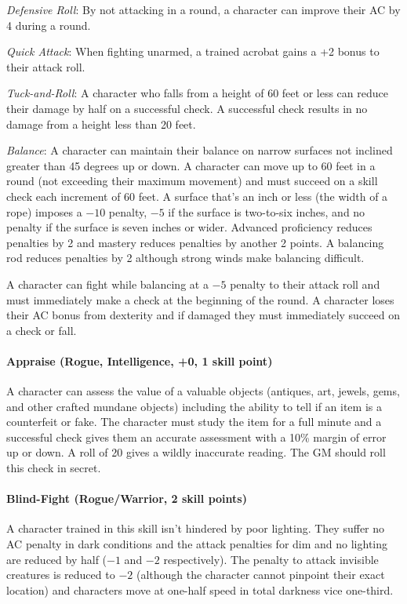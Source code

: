 \begin{multicols}{2}
\textit{Defensive Roll}: By not attacking in a round, a character can improve their AC by 4 during a round.  

\textit{Quick Attack}: When fighting unarmed, a trained acrobat gains a +2 bonus to their attack roll.

\textit{Tuck-and-Roll}: A character who falls from a height of 60 feet or less can reduce their damage by half on a successful check.  A successful check results in no damage from a height less than 20 feet.

\textit{Balance}: A character can maintain their balance on narrow surfaces not inclined greater than 45 degrees up or down.  A character can move up to 60 feet in a round (not exceeding their maximum movement) and must succeed on a skill check each increment of 60 feet.  A surface that's an inch or less (the width of a rope) imposes a $-10$ penalty, $-5$ if the surface is two-to-six inches, and no penalty if the surface is seven inches or wider.  Advanced proficiency reduces penalties by 2 and mastery reduces penalties by another 2 points.  A balancing rod reduces penalties by 2 although strong winds make balancing difficult.  

A character can fight while balancing at a $-5$ penalty to their attack roll and must immediately make a check at the beginning of the round.  A character loses their AC bonus from dexterity and if damaged they must immediately succeed on a check or fall.

\paragraph{Appraise (Rogue, Intelligence, +0, 1 skill point)}

A character can assess the value of a valuable objects (antiques, art, jewels, gems, and other crafted mundane objects) including the ability to tell if an item is a counterfeit or fake.  The character must study the item for a full minute and a successful check gives them an accurate assessment with a 10\% margin of error up or down.  A roll of 20 gives a wildly inaccurate reading.  The GM should roll this check in secret.

\paragraph{Blind-Fight (Rogue/Warrior, 2 skill points)}

A character trained in this skill isn't hindered by poor lighting.  They suffer no AC penalty in dark conditions and the attack penalties for dim and no lighting are reduced by half ($-1$ and $-2$ respectively).  The penalty to attack invisible creatures is reduced to $-2$ (although the character cannot pinpoint their exact location) and characters move at one-half speed in total darkness vice one-third.


\end{multicols}
